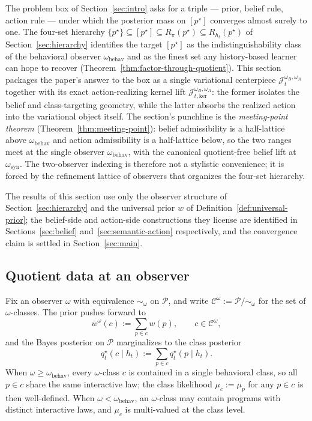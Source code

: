 \documentclass[11pt]{article}
\theoremstyle{definition}
\theoremstyle{remark}
\newcommand{\Ccal}{\mathcal{C}}
\newcommand{\Pcal}{\mathcal{P}}
\begin{document}
The problem box of Section~\ref{sec:intro} asks for a triple --- prior, belief rule, action rule --- under which the posterior mass on $[p^\star]$ converges almost surely to one. The four-set hierarchy $\{p^\star\}\subseteq[p^\star]\subseteq R_\pi(p^\star)\subseteq R_{h_t}(p^\star)$ of Section~\ref{sec:hierarchy} identifies the target $[p^\star]$ as the indistinguishability class of the behavioral observer $\omega_{\mathrm{behav}}$ and as the finest set any history-based learner can hope to recover (Theorem~\ref{thm:factor-through-quotient}). This section packages the paper's answer to the box as a single variational centerpiece $\mathcal J_t^{\omega_B,\omega_A}$ together with its exact action-realizing kernel lift $\mathcal J_{t,\mathrm{ker}}^{\omega_B,\omega_A}$: the former isolates the belief and class-targeting geometry, while the latter absorbs the realized action into the variational object itself. The section's punchline is the \emph{meeting-point theorem} (Theorem~\ref{thm:meeting-point}): belief admissibility is a half-lattice above $\omega_{\mathrm{behav}}$ and action admissibility is a half-lattice below, so the two ranges meet at the single observer $\omega_{\mathrm{behav}}$, with the canonical quotient-free belief lift at $\omega_{\mathrm{syn}}$. The two-observer indexing is therefore not a stylistic convenience; it is forced by the refinement lattice of observers that organizes the four-set hierarchy.

The results of this section use only the observer structure of Section~\ref{sec:hierarchy} and the universal prior $w$ of Definition~\ref{def:universal-prior}; the belief-side and action-side constructions they license are identified in Sections~\ref{sec:belief} and~\ref{sec:semantic-action} respectively, and the convergence claim is settled in Section~\ref{sec:main}.

\subsection{Quotient data at an observer}
\label{sec:quotient-data}

Fix an observer $\omega$ with equivalence $\sim_\omega$ on $\Pcal$, and write $\Ccal^\omega:=\Pcal/\!\sim_\omega$ for the set of $\omega$-classes. The prior pushes forward to
\[
\bar w^\omega(c):=\sum_{p\in c}w(p),\qquad c\in\Ccal^\omega,
\]
and the Bayes posterior on $\Pcal$ marginalizes to the class posterior
\[
q_t^\star(c\mid h_t):=\sum_{p\in c}q_t^\star(p\mid h_t).
\]
When $\omega\ge\omega_{\mathrm{behav}}$, every $\omega$-class $c$ is contained in a single behavioral class, so all $p\in c$ share the same interactive law; the class likelihood $\mu_c:=\mu_p$ for any $p\in c$ is then well-defined. When $\omega<\omega_{\mathrm{behav}}$, an $\omega$-class may contain programs with distinct interactive laws, and $\mu_c$ is multi-valued at the class level.
\end{document}
